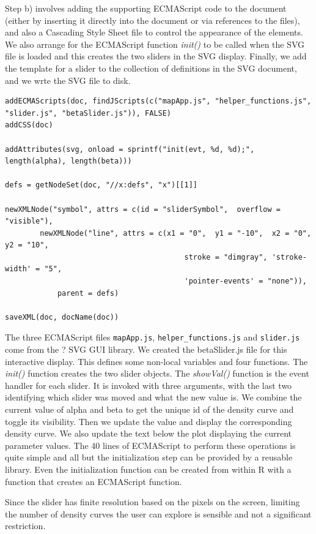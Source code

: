 \documentclass[article]{jss}
\def\JSfunc#1{\textsl{#1()}}
\begin{document}
Step b) involves adding the supporting ECMAScript code to the document
(either by inserting it directly into the document or via references
to the files), and also a Cascading Style Sheet file to control the
appearance of the elements.  We also arrange for the ECMAScript
function \JSfunc{init} to be called when the SVG file is loaded and
this creates the two sliders in the SVG display.  Finally, we add the
template for a slider to the collection of definitions in the SVG
document, and we wrte the SVG file to disk.
\begin{verbatim}
addECMAScripts(doc, findJScripts(c("mapApp.js", "helper_functions.js", "slider.js", "betaSlider.js")), FALSE)
addCSS(doc)

addAttributes(svg, onload = sprintf("init(evt, %d, %d);", length(alpha), length(beta)))

defs = getNodeSet(doc, "//x:defs", "x")[[1]]

newXMLNode("symbol", attrs = c(id = "sliderSymbol",  overflow = "visible"),
	    newXMLNode("line", attrs = c(x1 = "0",  y1 = "-10",  x2 = "0",  y2 = "10",
                                         stroke = "dimgray", 'stroke-width' = "5",
                                         'pointer-events' = "none")),
            parent = defs)

saveXML(doc, docName(doc))
\end{verbatim}
The three ECMAScript files \verb+mapApp.js+, \verb+helper_functions.js+ and
\verb+slider.js+ come from the ? SVG GUI library.  We created the
betaSlider.js file for this interactive display.  This defines some
non-local variables and four functions.  The \JSfunc{init} function
creates the two slider objects.  The \JSfunc{showVal} function is the
event handler for each slider. It is invoked with three arguments,
with the last two identifying which slider was moved and what the new
value is.  We combine the current value of alpha and beta to get the
unique id of the density curve and toggle its visibility.  Then we
update the value and display the corresponding density curve.  We also
update the text below the plot displaying the current parameter
values.  The 40 lines of ECMAScript to perform these operations is
quite simple and all but the initialization step can be provided by a
reusable library.  Even the initialization function can be created
from within R with a function that creates an ECMAScript function.


Since the slider has finite resolution based on the pixels on the
screen, limiting the number of density curves the user can explore is
sensible and not a significant restriction.
\end{document}
